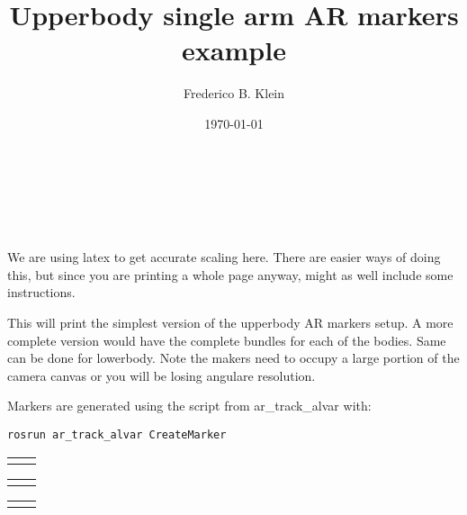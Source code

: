 \documentclass{article}
\title{\textbf{Upperbody single arm AR markers example }
}
\author{ Frederico B. Klein }
\date{\today}
\makeatletter
\renewcommand\maketitle{
{\raggedright %
\begin{center}
{\LARGE
\sffamily 
\@title }\\[2ex] 
{
\@author}\\[2ex] 
\@date\\[6ex]
\end{center}
}}
\newenvironment{Marker}[1]
    {\begin{center}
	    \vspace*{2cm}
	    \begin{tabular*}{\textwidth}{@{\extracolsep{\fill} } l r}
	    \rotatebox{90}{#1} &
    }
    { 
    \end{tabular*} 
	    \vspace*{2cm}
    \end{center}
    }
\makeatother
\begin{document}
\maketitle

\thispagestyle{empty}

We are using latex to get accurate scaling here. There are easier ways of doing this, but since you are printing a whole page anyway, might as well include some instructions. 

This will print the simplest version of the upperbody AR markers setup. A more complete version would have the complete bundles for each of the bodies. Same can be done for lowerbody. Note the makers need to occupy a large portion of the camera canvas or you will be losing angulare resolution. 

Markers are generated using the script from ar\_track\_alvar with:

\texttt{rosrun ar\_track\_alvar CreateMarker}

\begin{Marker}{TORAX}
    \centering
    \fbox{\texttt{[image: MarkerData\_0]}}
\end{Marker}


\begin{Marker}{UPPERARM}
    \centering
    \fbox{\texttt{[image: MarkerData\_2]}}
\end{Marker}

\begin{Marker}{FOREARM}
    \centering
    \fbox{\texttt{[image: MarkerData\_6]}}
\end{Marker}

\printbibliography
\end{document}
